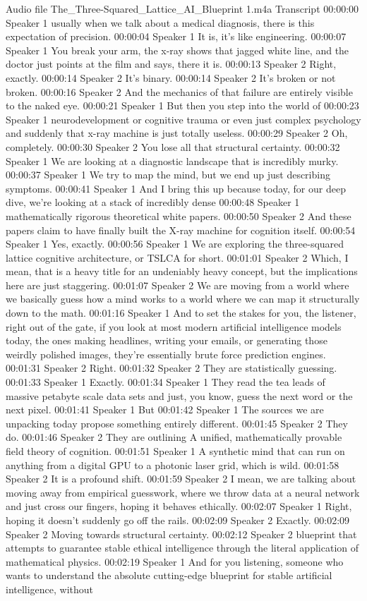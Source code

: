 Audio file The\_Three-Squared\_Lattice\_AI\_Blueprint 1.m4a Transcript 00:00:00 Speaker 1 usually when we talk about a medical diagnosis, there is this expectation of precision. 00:00:04 Speaker 1 It is, it's like engineering. 00:00:07 Speaker 1 You break your arm, the x-ray shows that jagged white line, and the doctor just points at the film and says, there it is. 00:00:13 Speaker 2 Right, exactly. 00:00:14 Speaker 2 It's binary. 00:00:14 Speaker 2 It's broken or not broken. 00:00:16 Speaker 2 And the mechanics of that failure are entirely visible to the naked eye. 00:00:21 Speaker 1 But then you step into the world of 00:00:23 Speaker 1 neurodevelopment or cognitive trauma or even just complex psychology and suddenly that x-ray machine is just totally useless. 00:00:29 Speaker 2 Oh, completely. 00:00:30 Speaker 2 You lose all that structural certainty. 00:00:32 Speaker 1 We are looking at a diagnostic landscape that is incredibly murky. 00:00:37 Speaker 1 We try to map the mind, but we end up just describing symptoms. 00:00:41 Speaker 1 And I bring this up because today, for our deep dive, we're looking at a stack of incredibly dense 00:00:48 Speaker 1 mathematically rigorous theoretical white papers. 00:00:50 Speaker 2 And these papers claim to have finally built the X-ray machine for cognition itself. 00:00:54 Speaker 1 Yes, exactly. 00:00:56 Speaker 1 We are exploring the three-squared lattice cognitive architecture, or TSLCA for short. 00:01:01 Speaker 2 Which, I mean, that is a heavy title for an undeniably heavy concept, but the implications here are just staggering. 00:01:07 Speaker 2 We are moving from a world where we basically guess how a mind works to a world where we can map it structurally down to the math. 00:01:16 Speaker 1 And to set the stakes for you, the listener, right out of the gate, if you look at most modern artificial intelligence models today, the ones making headlines, writing your emails, or generating those weirdly polished images, they're essentially brute force prediction engines. 00:01:31 Speaker 2 Right. 00:01:32 Speaker 2 They are statistically guessing. 00:01:33 Speaker 1 Exactly. 00:01:34 Speaker 1 They read the tea leads of massive petabyte scale data sets and just, you know, guess the next word or the next pixel. 00:01:41 Speaker 1 But 00:01:42 Speaker 1 The sources we are unpacking today propose something entirely different. 00:01:45 Speaker 2 They do. 00:01:46 Speaker 2 They are outlining A unified, mathematically provable field theory of cognition. 00:01:51 Speaker 1 A synthetic mind that can run on anything from a digital GPU to a photonic laser grid, which is wild. 00:01:58 Speaker 2 It is a profound shift. 00:01:59 Speaker 2 I mean, we are talking about moving away from empirical guesswork, where we throw data at a neural network and just cross our fingers, hoping it behaves ethically. 00:02:07 Speaker 1 Right, hoping it doesn't suddenly go off the rails. 00:02:09 Speaker 2 Exactly. 00:02:09 Speaker 2 Moving towards structural certainty. 00:02:12 Speaker 2 blueprint that attempts to guarantee stable ethical intelligence through the literal application of mathematical physics. 00:02:19 Speaker 1 And for you listening, someone who wants to understand the absolute cutting-edge blueprint for stable artificial intelligence, without 